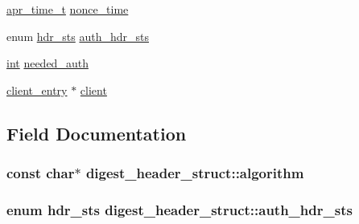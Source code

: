 \begin{DoxyCompactItemize}
\hyperlink{group__apr__time_gadb4bde16055748190eae190c55aa02bb}{apr\+\_\+time\+\_\+t} \hyperlink{structdigest__header__struct_a945a1c2632e6f463976c74fb13fcfb0f}{nonce\+\_\+time}
\item 
enum \hyperlink{mod__auth__digest_8c_ab1bcd611564ccf138d6c6bb9afd7ba45}{hdr\+\_\+sts} \hyperlink{structdigest__header__struct_ab3533b9b246ed323bbf9855ec0d3cc77}{auth\+\_\+hdr\+\_\+sts}
\item 
\hyperlink{pcre_8txt_a42dfa4ff673c82d8efe7144098fbc198}{int} \hyperlink{structdigest__header__struct_a9abb6747cd6f0b056c8937b338e9634b}{needed\+\_\+auth}
\item 
\hyperlink{mod__auth__digest_8c_a819a62c065fb6a0374a40347b496933a}{client\+\_\+entry} $\ast$ \hyperlink{structdigest__header__struct_a3c29843ff5f5ded59c4ac30b584d92aa}{client}
\end{DoxyCompactItemize}


\subsection{Field Documentation}
\subsubsection[{\texorpdfstring{algorithm}{algorithm}}]{\setlength{\rightskip}{0pt plus 5cm}const char$\ast$ digest\+\_\+header\+\_\+struct\+::algorithm}\hypertarget{structdigest__header__struct_a84b5a0819338fcd1e08f004aab6d9e71}{}\label{structdigest__header__struct_a84b5a0819338fcd1e08f004aab6d9e71}
\subsubsection[{\texorpdfstring{auth\+\_\+hdr\+\_\+sts}{auth_hdr_sts}}]{\setlength{\rightskip}{0pt plus 5cm}enum {\bf hdr\+\_\+sts} digest\+\_\+header\+\_\+struct\+::auth\+\_\+hdr\+\_\+sts}\hypertarget{structdigest__header__struct_ab3533b9b246ed323bbf9855ec0d3cc77}{}\label{structdigest__header__struct_ab3533b9b246ed323bbf9855ec0d3cc77}
